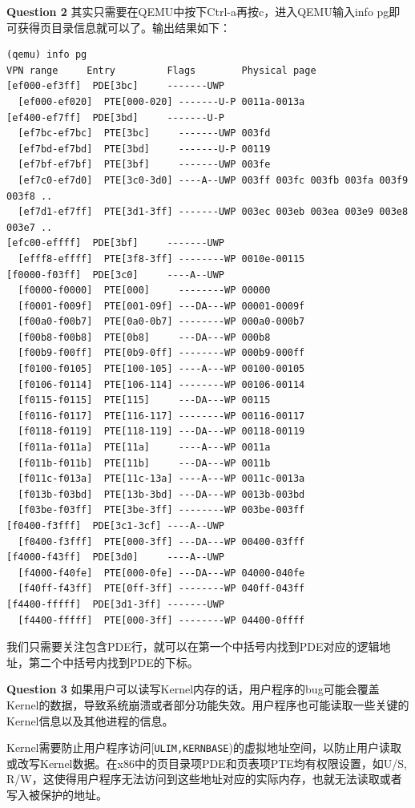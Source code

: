 \documentclass[11pt]{article}
\begin{document}
\noindent\textbf{Question 2}
其实只需要在QEMU中按下Ctrl-a再按c，进入QEMU输入info pg即可获得页目录信息就可以了。输出结果如下：
\begin{lstlisting}[aboveskip=-1.5em]
(qemu) info pg
VPN range     Entry         Flags        Physical page
[ef000-ef3ff]  PDE[3bc]     -------UWP
  [ef000-ef020]  PTE[000-020] -------U-P 0011a-0013a
[ef400-ef7ff]  PDE[3bd]     -------U-P
  [ef7bc-ef7bc]  PTE[3bc]     -------UWP 003fd
  [ef7bd-ef7bd]  PTE[3bd]     -------U-P 00119
  [ef7bf-ef7bf]  PTE[3bf]     -------UWP 003fe
  [ef7c0-ef7d0]  PTE[3c0-3d0] ----A--UWP 003ff 003fc 003fb 003fa 003f9 003f8 ..
  [ef7d1-ef7ff]  PTE[3d1-3ff] -------UWP 003ec 003eb 003ea 003e9 003e8 003e7 ..
[efc00-effff]  PDE[3bf]     -------UWP
  [efff8-effff]  PTE[3f8-3ff] --------WP 0010e-00115
[f0000-f03ff]  PDE[3c0]     ----A--UWP
  [f0000-f0000]  PTE[000]     --------WP 00000
  [f0001-f009f]  PTE[001-09f] ---DA---WP 00001-0009f
  [f00a0-f00b7]  PTE[0a0-0b7] --------WP 000a0-000b7
  [f00b8-f00b8]  PTE[0b8]     ---DA---WP 000b8
  [f00b9-f00ff]  PTE[0b9-0ff] --------WP 000b9-000ff
  [f0100-f0105]  PTE[100-105] ----A---WP 00100-00105
  [f0106-f0114]  PTE[106-114] --------WP 00106-00114
  [f0115-f0115]  PTE[115]     ---DA---WP 00115
  [f0116-f0117]  PTE[116-117] --------WP 00116-00117
  [f0118-f0119]  PTE[118-119] ---DA---WP 00118-00119
  [f011a-f011a]  PTE[11a]     ----A---WP 0011a
  [f011b-f011b]  PTE[11b]     ---DA---WP 0011b
  [f011c-f013a]  PTE[11c-13a] ----A---WP 0011c-0013a
  [f013b-f03bd]  PTE[13b-3bd] ---DA---WP 0013b-003bd
  [f03be-f03ff]  PTE[3be-3ff] --------WP 003be-003ff
[f0400-f3fff]  PDE[3c1-3cf] ----A--UWP
  [f0400-f3fff]  PTE[000-3ff] ---DA---WP 00400-03fff
[f4000-f43ff]  PDE[3d0]     ----A--UWP
  [f4000-f40fe]  PTE[000-0fe] ---DA---WP 04000-040fe
  [f40ff-f43ff]  PTE[0ff-3ff] --------WP 040ff-043ff
[f4400-fffff]  PDE[3d1-3ff] -------UWP
  [f4400-fffff]  PTE[000-3ff] --------WP 04400-0ffff
\end{lstlisting}
我们只需要关注包含PDE行，就可以在第一个中括号内找到PDE对应的逻辑地址，第二个中括号内找到PDE的下标。

\noindent\textbf{Question 3}
如果用户可以读写Kernel内存的话，用户程序的bug可能会覆盖Kernel的数据，导致系统崩溃或者部分功能失效。用户程序也可能读取一些关键的Kernel信息以及其他进程的信息。

Kernel需要防止用户程序访问[\lstinline|ULIM,KERNBASE|)的虚拟地址空间，以防止用户读取或改写Kernel数据。在x86中的页目录项PDE和页表项PTE均有权限设置，如U/S, R/W，这使得用户程序无法访问到这些地址对应的实际内存，也就无法读取或者写入被保护的地址。
\end{document}

